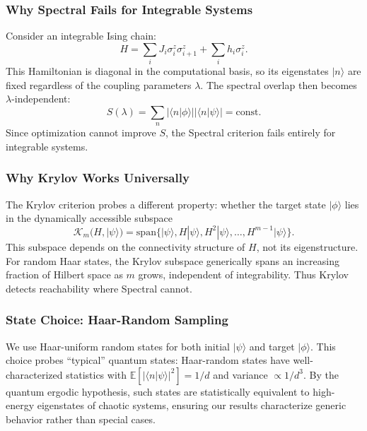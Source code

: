 \documentclass[aps,prx,reprint,superscriptaddress,footnote, twocolumn,notitlepage]{revtex4-2}
\begin{document}
\subsubsection{Why Spectral Fails for Integrable Systems}

Consider an integrable Ising chain:
\begin{equation}
    H = \sum_i J_i \sigma^z_i \sigma^z_{i+1} + \sum_i h_i \sigma^z_i.
    \label{eq:integrable_ising}
\end{equation}
This Hamiltonian is diagonal in the computational basis, so its eigenstates $|n\rangle$ are fixed regardless of the coupling parameters $\lambda$. The spectral overlap then becomes $\lambda$-independent:
\begin{equation}
    S(\lambda) = \sum_n |\langle n|\phi\rangle| |\langle n|\psi\rangle| = \text{const.}
\end{equation}
Since optimization cannot improve $S$, the Spectral criterion fails entirely for integrable systems.

\subsubsection{Why Krylov Works Universally}

The Krylov criterion probes a different property: whether the target state $|\phi\rangle$ lies in the dynamically accessible subspace
\begin{equation}
    \mathcal{K}_m(H,|\psi\rangle) = \mathrm{span}\{|\psi\rangle, H|\psi\rangle, H^2|\psi\rangle, \ldots, H^{m-1}|\psi\rangle\}.
\end{equation}
This subspace depends on the connectivity structure of $H$, not its eigenstructure. For random Haar states, the Krylov subspace generically spans an increasing fraction of Hilbert space as $m$ grows, independent of integrability. Thus Krylov detects reachability where Spectral cannot.

\subsubsection{State Choice: Haar-Random Sampling}

We use Haar-uniform random states for both initial $|\psi\rangle$ and target $|\phi\rangle$. This choice probes ``typical'' quantum states: Haar-random states have well-characterized statistics with $\mathbb{E}[|\langle n|\psi\rangle|^2] = 1/d$ and variance $\propto 1/d^3$. By the quantum ergodic hypothesis, such states are statistically equivalent to high-energy eigenstates of chaotic systems, ensuring our results characterize generic behavior rather than special cases.
\end{document}
